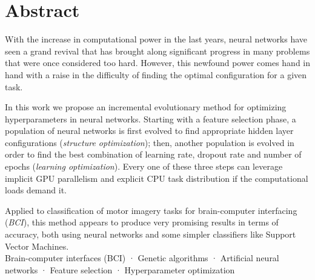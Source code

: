 \begingroup

\chapter*{Abstract}

With the increase in computational power in the last years, neural networks have seen a grand revival that has brought along significant progress in many problems that were once considered too hard. However, this newfound power comes hand in hand with a raise in the difficulty of finding the optimal configuration for a given task.

In this work we propose an incremental evolutionary method for optimizing hyperparameters in neural networks. Starting with a feature selection phase, a population of neural networks is first evolved to find appropriate hidden layer configurations (\textit{structure optimization}); then, another population is evolved in order to find the best combination of learning rate, dropout rate and number of epochs (\textit{learning optimization}). Every one of these three steps can leverage implicit GPU parallelism and explicit CPU task distribution if the computational loads demand it.

Applied to classification of motor imagery tasks for brain-computer interfacing (\textit{BCI}), this method appears to produce very promising results in terms of accuracy, both using neural networks and some simpler classifiers like Support Vector Machines.\\

\noindent{} Brain-computer interfaces (BCI) · Genetic algorithms · Artificial neural networks · Feature selection · Hyperparameter optimization


\vfill
